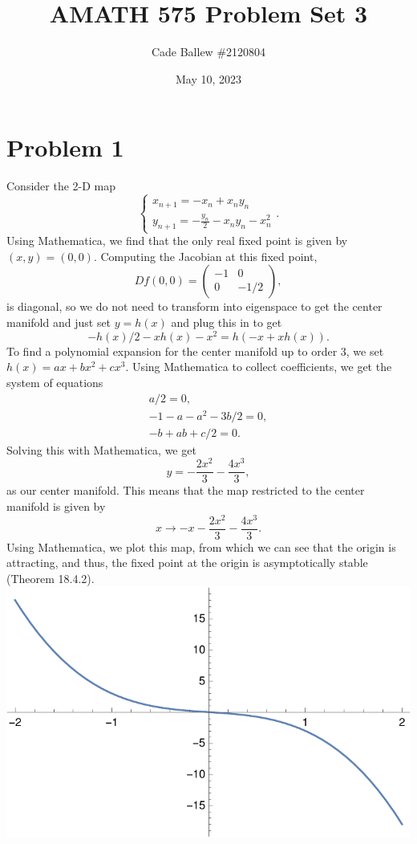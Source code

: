 \documentclass{article}
\title{AMATH 575 Problem Set 3}
\author{Cade Ballew \#2120804}
\date{May 10, 2023}
\begin{document}
	
\maketitle
	
\section{Problem 1}
Consider the 2-D map
\begin{equation*}
	\left\{\begin{array}{l}
		x_{n+1} = -x_n + x_n y_n \\
		y_{n+1} = - \frac{y_n}{2} - x_n y_n - x_n^2  
	\end{array}\right..
\end{equation*}
Using Mathematica, we find that the only real fixed point is given by $(x,y)=(0,0)$. Computing the Jacobian at this fixed point,
\[
Df(0,0)=\begin{pmatrix}
-1&0\\
0&-1/2
\end{pmatrix},
\]
is diagonal, so we do not need to transform into eigenspace to get the center manifold and just set $y=h(x)$ and plug this in to get
\[
-h(x)/2-xh(x)-x^2=h(-x+xh(x)).
\]
To find a polynomial expansion for the center manifold up to order 3, we set $h(x)=ax+bx^2+cx^3$. Using Mathematica to collect coefficients, we get the system of equations 
\begin{align*}
a/2=0,\\
-1 - a - a^2 - 3 b/2 = 0,\\
-b + a b + c/2 = 0.
\end{align*}
Solving this with Mathematica, we get
\[
y=-\frac{2x^2}{3}-\frac{4x^3}{3},
\]
as our center manifold. This means that the map restricted to the center manifold is given by
\[
x\to-x-\frac{2x^2}{3}-\frac{4x^3}{3}.
\]
Using Mathematica, we plot this map, from which we can see that the origin is attracting, and thus, the fixed point at the origin is asymptotically stable (Theorem 18.4.2). \\
\includegraphics{plot.pdf}
\end{document}
